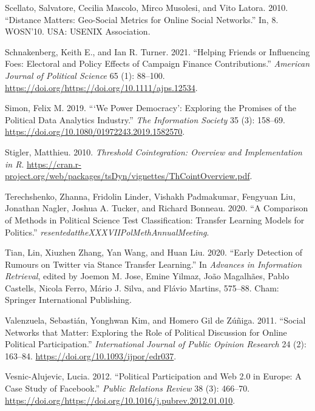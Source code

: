 \documentclass[12pt,]{article}
\begin{document}
\leavevmode\hypertarget{ref-scellato2010}{}%
Scellato, Salvatore, Cecilia Mascolo, Mirco Musolesi, and Vito Latora.
2010. ``Distance Matters: Geo-Social Metrics for Online Social
Networks.'' In, 8. WOSN'10. USA: USENIX Association.

\leavevmode\hypertarget{ref-schnakenberg2021}{}%
Schnakenberg, Keith E., and Ian R. Turner. 2021. ``Helping Friends or
Influencing Foes: Electoral and Policy Effects of Campaign Finance
Contributions.'' \emph{American Journal of Political Science} 65 (1):
88--100. \url{https://doi.org/https://doi.org/10.1111/ajps.12534}.

\leavevmode\hypertarget{ref-simon2019}{}%
Simon, Felix M. 2019. ```We Power Democracy': Exploring the Promises of
the Political Data Analytics Industry.'' \emph{The Information Society}
35 (3): 158--69. \url{https://doi.org/10.1080/01972243.2019.1582570}.

\leavevmode\hypertarget{ref-tsdyn}{}%
Stigler, Matthieu. 2010. \emph{Threshold Cointegration: Overview and
Implementation in R}.
\url{https://cran.r-project.org/web/packages/tsDyn/vignettes/ThCointOverview.pdf}.

\leavevmode\hypertarget{ref-terechshenko2020}{}%
Terechshenko, Zhanna, Fridolin Linder, Vishakh Padmakumar, Fengyuan Liu,
Jonathan Nagler, Joshua A. Tucker, and Richard Bonneau. 2020. ``A
Comparison of Methods in Political Science Test Classification: Transfer
Learning Models for Politics.''
\emph{resentedattheXXXVIIPolMethAnnualMeeting}.

\leavevmode\hypertarget{ref-tian2020}{}%
Tian, Lin, Xiuzhen Zhang, Yan Wang, and Huan Liu. 2020. ``Early
Detection of Rumours on Twitter via Stance Transfer Learning.'' In
\emph{Advances in Information Retrieval}, edited by Joemon M. Jose,
Emine Yilmaz, João Magalhães, Pablo Castells, Nicola Ferro, Mário J.
Silva, and Flávio Martins, 575--88. Cham: Springer International
Publishing.

\leavevmode\hypertarget{ref-valenzuela2011}{}%
Valenzuela, Sebastián, Yonghwan Kim, and Homero Gil de Zúñiga. 2011.
``Social Networks that Matter: Exploring the Role of Political
Discussion for Online Political Participation.'' \emph{International
Journal of Public Opinion Research} 24 (2): 163--84.
\url{https://doi.org/10.1093/ijpor/edr037}.

\leavevmode\hypertarget{ref-vesnic2012}{}%
Vesnic-Alujevic, Lucia. 2012. ``Political Participation and Web 2.0 in
Europe: A Case Study of Facebook.'' \emph{Public Relations Review} 38
(3): 466--70.
\url{https://doi.org/https://doi.org/10.1016/j.pubrev.2012.01.010}.
\end{document}
